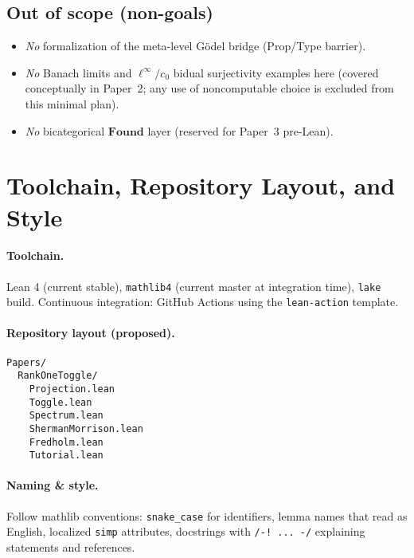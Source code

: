 \documentclass[11pt]{article}
\begin{document}
\subsection*{Out of scope (non-goals)}
\begin{itemize}
  \item \emph{No} formalization of the meta-level Gödel bridge (Prop/Type barrier).
  \item \emph{No} Banach limits and \(\ell^\infty/c_0\) bidual surjectivity examples here (covered conceptually in Paper~2; any use of noncomputable choice is excluded from this minimal plan).
  \item \emph{No} bicategorical \(\mathbf{Found}\) layer (reserved for Paper~3 pre-Lean).
\end{itemize}

\section{Toolchain, Repository Layout, and Style}\label{sec:tooling}

\paragraph{Toolchain.}
Lean 4 (current stable), \texttt{mathlib4} (current master at integration time), \texttt{lake} build. Continuous integration: GitHub Actions using the \texttt{lean-action} template.

\paragraph{Repository layout (proposed).}
\begin{verbatim}
Papers/
  RankOneToggle/
    Projection.lean
    Toggle.lean
    Spectrum.lean
    ShermanMorrison.lean
    Fredholm.lean
    Tutorial.lean
\end{verbatim}

\paragraph{Naming \& style.}
Follow mathlib conventions: \texttt{snake\_case} for identifiers, lemma names that read as English, localized \texttt{simp} attributes, docstrings with \verb|/-! ... -/| explaining statements and references.

\end{document}
